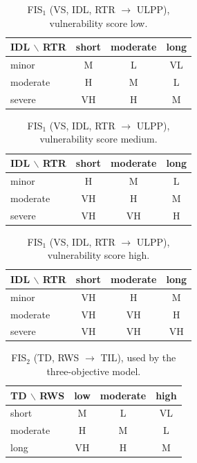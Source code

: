 \begin{table}[h]
\centering
\caption{FIS$_1$ (VS, IDL, RTR $\to$ ULPP), vulnerability score low.}\label{tab:s-fis1-low}
\small
\begin{tabular}{lccc}
\toprule
IDL $\backslash$ RTR & short & moderate & long\\
\midrule
minor & M & L & VL\\
moderate & H & M & L\\
severe & VH & H & M\\
\bottomrule
\end{tabular}
\end{table}

\begin{table}[h]
\centering
\caption{FIS$_1$ (VS, IDL, RTR $\to$ ULPP), vulnerability score medium.}\label{tab:s-fis1-medium}
\small
\begin{tabular}{lccc}
\toprule
IDL $\backslash$ RTR & short & moderate & long\\
\midrule
minor & H & M & L\\
moderate & VH & H & M\\
severe & VH & VH & H\\
\bottomrule
\end{tabular}
\end{table}

\begin{table}[h]
\centering
\caption{FIS$_1$ (VS, IDL, RTR $\to$ ULPP), vulnerability score high.}\label{tab:s-fis1-high}
\small
\begin{tabular}{lccc}
\toprule
IDL $\backslash$ RTR & short & moderate & long\\
\midrule
minor & VH & H & M\\
moderate & VH & VH & H\\
severe & VH & VH & VH\\
\bottomrule
\end{tabular}
\end{table}

\begin{table}[h]
\centering
\caption{FIS$_2$ (TD, RWS $\to$ TIL), used by the three-objective model.}\label{tab:s-fis2}
\small
\begin{tabular}{lccc}
\toprule
TD $\backslash$ RWS & low & moderate & high\\
\midrule
short & M & L & VL\\
moderate & H & M & L\\
long & VH & H & M\\
\bottomrule
\end{tabular}
\end{table}

